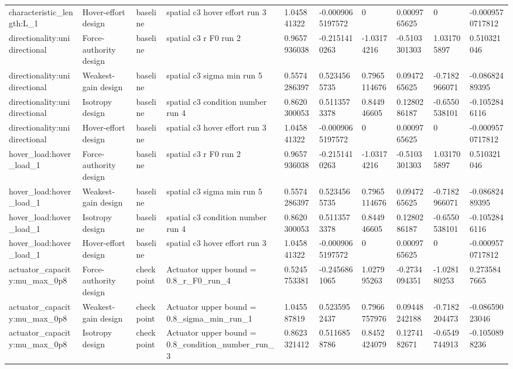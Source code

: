 \begin{tabular}{@{}llllllllll@{}}
characteristic\_length:L\_1 & Hover-effort design & baseline & spatial c3 hover effort run 3 & 1.045841322 & -0.0009065197572 & 0 & 0.0009765625 & 0 & -0.0009570717812 \\
directionality:unidirectional & Force-authority design & baseline & spatial c3 r F0 run 2 & 0.9657936038 & -0.2151410263 & -1.03174216 & -0.5103301303 & 1.031705897 & 0.510321046 \\
directionality:unidirectional & Weakest-gain design & baseline & spatial c3 sigma min run 5 & 0.5574286397 & 0.5234565735 & 0.7965114676 & 0.0947265625 & -0.7182966071 & -0.08682489395 \\
directionality:unidirectional & Isotropy design & baseline & spatial c3 condition number run 4 & 0.8620300053 & 0.5113573378 & 0.844946605 & 0.1280286187 & -0.6550538101 & -0.1052846116 \\
directionality:unidirectional & Hover-effort design & baseline & spatial c3 hover effort run 3 & 1.045841322 & -0.0009065197572 & 0 & 0.0009765625 & 0 & -0.0009570717812 \\
hover\_load:hover\_load\_1 & Force-authority design & baseline & spatial c3 r F0 run 2 & 0.9657936038 & -0.2151410263 & -1.03174216 & -0.5103301303 & 1.031705897 & 0.510321046 \\
hover\_load:hover\_load\_1 & Weakest-gain design & baseline & spatial c3 sigma min run 5 & 0.5574286397 & 0.5234565735 & 0.7965114676 & 0.0947265625 & -0.7182966071 & -0.08682489395 \\
hover\_load:hover\_load\_1 & Isotropy design & baseline & spatial c3 condition number run 4 & 0.8620300053 & 0.5113573378 & 0.844946605 & 0.1280286187 & -0.6550538101 & -0.1052846116 \\
hover\_load:hover\_load\_1 & Hover-effort design & baseline & spatial c3 hover effort run 3 & 1.045841322 & -0.0009065197572 & 0 & 0.0009765625 & 0 & -0.0009570717812 \\
actuator\_capacity:mu\_max\_0p8 & Force-authority design & checkpoint & Actuator upper bound = 0.8\_r\_F0\_run\_4 & 0.5245753381 & -0.2456861065 & 1.027995263 & -0.2734094351 & -1.028180253 & 0.2735847665 \\
actuator\_capacity:mu\_max\_0p8 & Weakest-gain design & checkpoint & Actuator upper bound = 0.8\_sigma\_min\_run\_1 & 1.045587819 & 0.5235952437 & 0.7966757976 & 0.09448242188 & -0.7182204473 & -0.08659023046 \\
actuator\_capacity:mu\_max\_0p8 & Isotropy design & checkpoint & Actuator upper bound = 0.8\_condition\_number\_run\_3 & 0.8623321412 & 0.5116858786 & 0.8452424079 & 0.1274182671 & -0.6549744913 & -0.1050898236 \\

\end{tabular}
